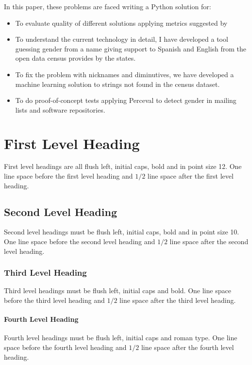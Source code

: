 \documentclass[a4paper]{article}
\begin{document}
In this paper, these problems are faced writing a Python solution for:

\begin{itemize}
\item To evaluate quality of different solutions applying metrics
  suggested by ~\cite{10.7717/peerj-cs.156}
\item To understand the current technology in detail, I have developed
  a tool guessing gender from a name giving support to Spanish and
  English from the open data census provides by the states.
\item To fix the problem with nicknames and diminutives, we have
  developed a machine learning solution to strings not found in the
  census dataset.
\item To do proof-of-concept tests applying Perceval to detect
  gender in mailing lists and software repositories.
\end{itemize}


\section{First Level Heading}

First level headings are all flush left, initial caps, bold and in point
size 12. One line space before the first level heading and $1/2$ line
space after the first level heading.

\subsection{Second Level Heading}

Second level headings must be flush left, initial caps, bold and in point
size 10. One line space before the second level heading and $1/2$ line
space after the second level heading.

\subsubsection{Third Level Heading}

Third level headings must be flush left, initial caps and bold.
One line space before the third level heading and $1/2$ line
space after the third level heading.

\paragraph{Fourth Level Heading}

Fourth level headings must be flush left, initial caps and roman type.
One line space before the fourth level heading and $1/2$ line
space after the fourth level heading.
\end{document}
